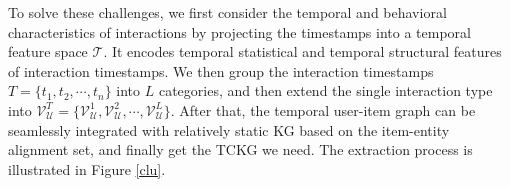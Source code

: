 To solve these challenges, we first consider the temporal and behavioral characteristics of interactions by projecting the timestamps into a temporal feature space $\mathcal{T}$.
It encodes temporal statistical and temporal structural features of interaction timestamps.
We then group the interaction timestamps $T = \{t_1, t_2, \cdots, t_n\}$ into $L$ categories, and then extend the single interaction type into $\mathcal{V}_{\mathcal{U}}^T = \{ \mathcal{V}_{\mathcal{U}}^1, \mathcal{V}_{\mathcal{U}}^2, \cdots, \mathcal{V}_{\mathcal{U}}^{L} \}$.
After that, the temporal user-item graph can be seamlessly integrated with relatively static KG based on the item-entity alignment set, and finally get the TCKG we need.
The extraction process is illustrated in Figure \ref{clu}.





 
